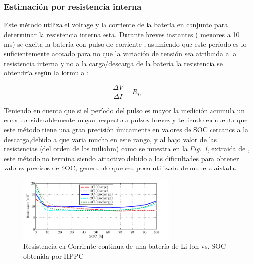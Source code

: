 \documentclass[10pt,a4paper]{article}
\begin{document}
	
	
	
	\subsubsection{Estimación por resistencia interna}
	
	Este método utiliza el voltage y la corriente de la batería en conjunto para determinar la resistencia interna esta. Durante breves instantes ( menores a 10 ms) se excita la batería con pulso de corriente , asumiendo que este período es lo suficientemente acotado para no que la variación de tensión sea atribuida a la resistencia interna y no a la carga/descarga de la batería la resistencia se obtendría según la formula :
	
	\begin{figure}[h!]
		\begin{center}
			\begin{equation}
				\frac{\Delta V}{\Delta I} = R_\Omega 
				\label{Internal_resistance_EQ}
			\end{equation}	
		\end{center}
	\end{figure}
	
	Teniendo en cuenta que si el período del pulso es mayor la medición acumula un error considerablemente mayor respecto a pulsos breves y teniendo en cuenta que este método tiene una gran precisión únicamente en valores de SOC cercanos a la descarga,debido a que varia mucho en este rango, y al bajo valor de las resistencias (del orden de los miliohm) como se muestra en la \emph{ Fig. \ref{Internal_resistance}}, extraida de \cite{hentunen2014}, este método no termina siendo atractivo debido a las dificultades para obtener valores precisos de SOC, generando que sea poco utilizado de manera aislada.
	
	\begin{figure}[h!]
		\begin{center}
			\includegraphics[width=0.7\textwidth]{Ro_vs_SOC.png}
			\caption{Resistencia en Corriente continua de una batería de Li-Ion vs. SOC obtenida por HPPC}
			\label{Internal_resistance}
		\end{center}
	\end{figure}
	\clearpage
\end{document}

